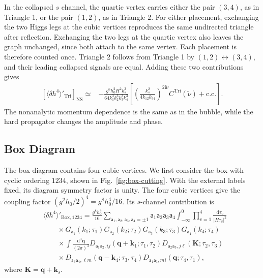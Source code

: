 \documentclass[a4paper,12pt]{article}
\def\di{{\mathrm{d}}}
\def\mb{\mathbf}
\def\ii{\mathrm{i}}
\def\aa{\mathsf{a}}
\begin{document}
In the collapsed $s$ channel, the quartic vertex carries either the pair $(3,4)$, as in Triangle 1, or the pair $(1,2)$, as in Triangle 2.
For either placement, exchanging the two Higgs legs at the cubic vertices reproduces the same undirected triangle after reflection.
Exchanging the two legs at the quartic vertex also leaves the graph unchanged, since both attach to the same vertex.
Each placement is therefore counted once.
Triangle 2 follows from Triangle 1 by $(1,2)\leftrightarrow(3,4)$, and their leading collapsed signals are equal.
Adding these two contributions gives
\begin{align}
    \left[\langle\delta h^4\rangle'_{\mathrm{Tri}}\right]_{\mathrm{NS}}
    \simeq{}&-\frac{g^6h_0^2H^2k_s^3}
    {64k_1^3k_2^3k_3^3k_4^3}
    \left[\left(\frac{k_s^2}{4k_{12}k_{34}}\right)^{2\ii\tilde\nu}
    C^{\mathrm{Tri}}(\tilde\nu)
    +\text{c.c.}\right].
    \label{eq:triangle-total-signal}
\end{align}
The nonanalytic momentum dependence is the same as in the bubble, while the hard propagator changes the amplitude and phase.

\FloatBarrier
\subsection{Box Diagram}
\label{sec:gauge-box}
The box diagram contains four cubic vertices.
We first consider the box with cyclic ordering $1234$, shown in Fig.~\ref{fig:box-cutting}.
With the external labels fixed, its diagram symmetry factor is unity.
The four cubic vertices give the coupling factor $(g^2h_0/2)^4=g^8h_0^4/16$.
Its $s$-channel contribution is
\begin{align}
    &\langle\delta h^4\rangle'_{\mathrm{Box},1234}
    =\frac{g^8h_0^4}{16}
    \sum_{\aa_1,\aa_2,\aa_3,\aa_4=\pm1}\aa_1\aa_2\aa_3\aa_4
    \int_{-\infty}^0\prod_{v=1}^{4}
    \frac{\di\tau_v}{|H\tau_v|^2}
    \nonumber\\
    &\qquad\times G_{\aa_1}(k_1;\tau_1)G_{\aa_2}(k_2;\tau_2)
    G_{\aa_3}(k_3;\tau_3)G_{\aa_4}(k_4;\tau_4)
    \nonumber\\
    &\qquad\times\int\frac{\di^3\mb q}{(2\pi)^3}
    D_{\aa_1\aa_2,ij}(\mb q+\mb k_1;\tau_1,\tau_2)
    D_{\aa_2\aa_3,j\ell}(\mb K;\tau_2,\tau_3)
    \nonumber\\
    &\qquad\times D_{\aa_3\aa_4,\ell m}(\mb q-\mb k_4;\tau_3,\tau_4)
    D_{\aa_4\aa_1,mi}(\mb q;\tau_4,\tau_1),
    \label{eq:box-sk}
\end{align}
where $\mb K=\mb q+\mb k_s$.
\end{document}
